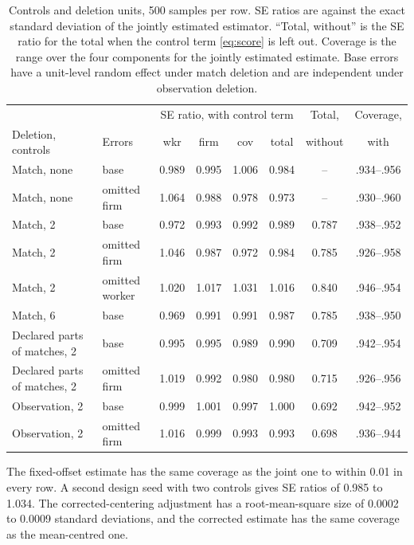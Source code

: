 \documentclass[11pt]{article}
\begin{document}
\begin{table}[ht]
\centering\small
\begin{tabular}{@{}llcccc@{\hskip 1.2em}c@{\hskip 1.2em}c@{}}
\toprule
 & & \multicolumn{4}{c}{SE ratio, with control term} & Total, & Coverage, \\
Deletion, controls & Errors & wkr & firm & cov & total & without & with \\
\midrule
Match, none & base & 0.989 & 0.995 & 1.006 & 0.984 & -- & .934--.956 \\
Match, none & omitted firm & 1.064 & 0.988 & 0.978 & 0.973 & -- & .930--.960 \\
Match, 2 & base & 0.972 & 0.993 & 0.992 & 0.989 & 0.787 & .938--.952 \\
Match, 2 & omitted firm & 1.046 & 0.987 & 0.972 & 0.984 & 0.785 & .926--.958 \\
Match, 2 & omitted worker & 1.020 & 1.017 & 1.031 & 1.016 & 0.840 & .946--.954 \\
Match, 6 & base & 0.969 & 0.991 & 0.991 & 0.987 & 0.785 & .938--.950 \\
Declared parts of matches, 2 & base & 0.995 & 0.995 & 0.989 & 0.990 & 0.709 & .942--.954 \\
Declared parts of matches, 2 & omitted firm & 1.019 & 0.992 & 0.980 & 0.980 & 0.715 & .926--.956 \\
Observation, 2 & base & 0.999 & 1.001 & 0.997 & 1.000 & 0.692 & .942--.952 \\
Observation, 2 & omitted firm & 1.016 & 0.999 & 0.993 & 0.993 & 0.698 & .936--.944 \\
\bottomrule
\end{tabular}
\caption{Controls and deletion units, 500 samples per row. SE ratios are
against the exact standard deviation of the jointly estimated estimator.
``Total, without'' is the SE ratio for the total when the control term
\eqref{eq:score} is left out. Coverage is the range over the four components
for the jointly estimated estimate. Base errors have a unit-level random
effect under match deletion and are independent under observation deletion.}
\label{tab:controls}
\end{table}

The fixed-offset estimate has the same coverage as the joint one to within
0.01 in every row. A second design seed with two controls gives SE ratios of
0.985 to 1.034. The corrected-centering adjustment has a root-mean-square
size of 0.0002 to 0.0009 standard deviations, and the corrected estimate has
the same coverage as the mean-centred one.
\end{document}
